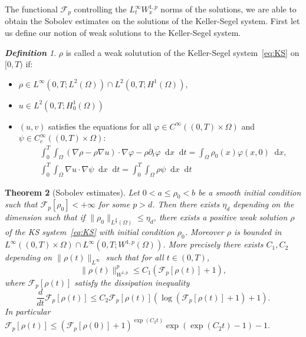 \documentclass[a4paper,twosided, 11pt]{article}
\renewcommand{\color}[2][]{}
\newcommand {\f}   {\frac}
\theoremstyle{plain}
\newtheorem{thm}{Theorem}[section]
\theoremstyle{remark}
\newtheorem{definition}[thm]{\bf Definition}
\newcommand{\diff}{\mathop{}\!\mathrm{d}}
\numberwithin{equation}{section}
\begin{document}
The functional $\mathcal{F}_{p}$ controlling the $L^{\infty}_{t}W^{1,p}_{x}$ norms of the solutions, we are able to obtain the Sobolev estimates on the solutions of the Keller-Segel system. First let us define our notion of weak solutions to the Keller-Segel system.
{\color{blue}
\begin{definition}
$\rho$ is called a weak solutution of the Keller-Segel system~\eqref{eq:KS} on $[0,T)$ if:
\begin{itemize}
    \item $\rho\in L^{\infty}(0,T; L^{2}(\Omega))\cap L^{2}(0,T; H^{1}(\Omega))$,
    \item $u\in L^{2}(0,T; H^{1}_{0}(\Omega))$
    \item $(u,v)$ satisfies the equations for all $\varphi\in C^{\infty}((0,T)\times \Omega)$ and $\psi\in C_{c}^{\infty}((0,T)\times\Omega)$:
    \begin{align*}
    &\int_{0}^{T}\int_{\Omega}(\nabla \rho - \rho\nabla u) \cdot \nabla \varphi - \rho \partial_t\varphi \diff x \diff t= \int_{\Omega}\rho_{0}(x) \varphi(x,0)\diff x,\\
    &\int_{0}^{T}\int_{\Omega}\nabla u \cdot \nabla\psi\diff x \diff t =\int_{0}^{T}\int_{\Omega} \rho \psi \diff x \diff t
    \end{align*}
\end{itemize}
\end{definition}
}

\begin{thm}[Sobolev estimates]\label{thm:sobolev_bounds}
{\color{blue}Let $0<a \le \rho_0<b$ be a smooth initial condition such that $\mathcal{F}_{p}[\rho_0]<+\infty$ for some $p>d$. Then there exists $\eta_{d}$ depending on the dimension such that if $\|\rho_0\|_{L^{\frac{d}{2}}(\Omega)}\le \eta_d$, there exists a positive weak solution $\rho$ of the KS system~\eqref{eq:KS} with initial condition $\rho_0$. Moreover  $\rho$ is bounded in $L^{\infty}((0,T)\times\Omega)\cap L^{\infty}(0,T; W^{1,p}(\Omega))$.} More precisely there exists $C_1, C_2$ depending on $\|\rho(t)\|_{L^{\infty}}$ such that for all $t\in(0,T)$, 
$$
\|\rho(t)\|_{W^{1,p}}^{p} \le C_1(\mathcal{F}_{p}[\rho(t)] + 1),
$$ 
where $\mathcal{F}_{p}[\rho(t)]$ satisfy the dissipation inequality
$$
\f{d}{dt}\mathcal{F}_{p}[\rho(t)]\le C_2 \mathcal{F}_{p}[\rho(t)](\log(\mathcal{F}_{p}[\rho(t)]+1)+1). 
$$
In particular $\mathcal{F}_{p}[\rho(t)]\le (\mathcal{F}_{p}[\rho(0)]+1)^{\exp(C_2t)}\exp(\exp(C_2t)-1)-1.$
\end{thm}
\end{document}
